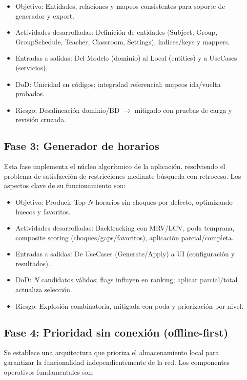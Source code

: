 \begin{itemize}
  \item Objetivo: Entidades, relaciones y mapeos consistentes para soporte de generador y export.
  \item Actividades desarrolladas: Definición de entidades (Subject, Group, GroupSchedule, Teacher, Classroom, Settings), índices/keys y mappers.
  \item Entradas a salidas: Del Modelo (dominio) al Local (entities) y a UseCases (servicios).
  \item DoD: Unicidad en códigos; integridad referencial; mapeos ida/vuelta probados.
  \item Riesgo: Desalineación dominio/BD $\rightarrow$ mitigado con pruebas de carga y revisión cruzada.
\end{itemize}

\subsection{Fase 3: Generador de horarios}
Esta fase implementa el núcleo algorítmico de la aplicación, resolviendo el problema de satisfacción de restricciones mediante búsqueda con retroceso. Los aspectos clave de su funcionamiento son:

\begin{itemize}
  \item Objetivo: Producir Top-$N$ horarios sin choques por defecto, optimizando huecos y favoritos.
  \item Actividades desarrolladas: Backtracking con MRV/LCV, poda temprana, composite scoring (choques/gaps/favoritos), aplicación parcial/completa.
  \item Entradas a salidas: De UseCases (Generate/Apply) a UI (configuración y resultados).
  \item DoD: $N$ candidatos válidos; flags influyen en ranking; aplicar parcial/total actualiza selección.
  \item Riesgo: Explosión combinatoria, mitigada con poda y priorización por nivel.
\end{itemize}

\subsection{Fase 4: Prioridad sin conexión (offline-first)}
Se establece una arquitectura que prioriza el almacenamiento local para garantizar la funcionalidad independientemente de la red. Los componentes operativos fundamentales son:

